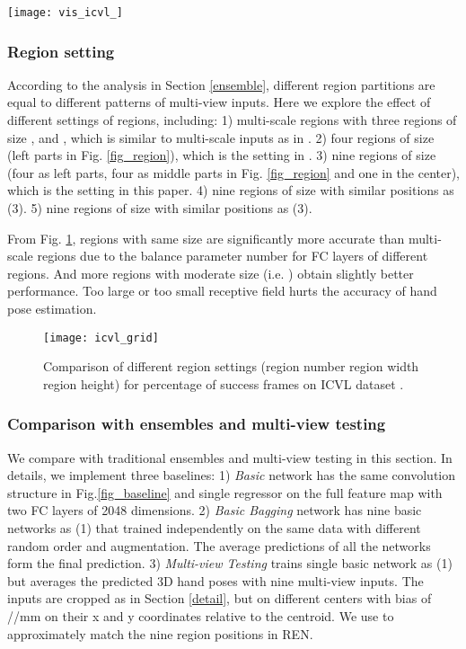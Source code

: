 \documentclass[10pt,twocolumn,letterpaper]{article}
\begin{document}
\begin{figure*}[htb]
\centering
{\texttt{[image: vis\_icvl\_]}}
\caption{Example results on ICVL \cite{tang2014latent} dataset: ground truth (first row), basic network (second row, corresponding to the fifth row in Table 1), and region ensemble network (third row, corresponding to the seventh row in Table 1).}
\label{fig_vis}
\end{figure*}

\subsubsection{Region setting}
\label{setting}
According to the analysis in Section \ref{ensemble}, different region partitions are equal to different patterns of multi-view inputs. Here we explore the effect of different settings of regions, including: 1) multi-scale regions with three regions of size ,  and , which is similar to multi-scale inputs as in \cite{tompson2014real} \cite{oberweger2015hands}. 2) four regions of size  (left parts in Fig. \ref{fig_region}), which is the setting in \cite{guo2017region}. 3) nine regions of size  (four as left parts, four as middle parts in Fig. \ref{fig_region} and one in the center), which is the setting in this paper. 4) nine regions of size  with similar positions as (3). 5) nine regions of size  with similar positions as (3).

From Fig. \ref{fig_grid}, regions with same size are significantly more accurate than multi-scale regions due to the balance parameter number for FC layers of different regions. And more regions with moderate size (i.e. ) obtain slightly better performance. Too large or too small receptive field hurts the accuracy of hand pose estimation.

\begin{figure}[htb]
\centering
{\texttt{[image: icvl\_grid]}}
\caption{Comparison of different region settings (region number  region width  region height) for percentage of success frames on ICVL dataset \cite{tang2014latent}. }
\label{fig_grid}
\end{figure}

\subsubsection{Comparison with ensembles and multi-view testing}
\label{basic}
We compare with traditional ensembles and multi-view testing in this section. In details, we implement three baselines: 1) \emph{Basic} network has the same convolution structure in Fig.\ref{fig_baseline} and single regressor on the full feature map with two FC layers of 2048 dimensions. 2) \emph{Basic Bagging} network has nine basic networks as (1) that trained independently on the same data with different random order and augmentation. The average predictions of all the networks form the final prediction. 3) \emph{Multi-view Testing} trains single basic network as (1) but averages the predicted 3D hand poses with nine multi-view inputs. The inputs are cropped as in Section \ref{detail}, but on different centers with bias of //mm on their x and y coordinates relative to the centroid. We use  to approximately match the nine region positions in REN.
\end{document}
